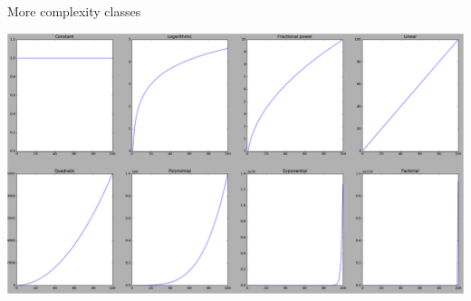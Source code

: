 \begin{frame}{More complexity classes}
	\begin{center}
		\includegraphics[width=\textwidth]{complexity_classes}
	\end{center}
\end{frame}

